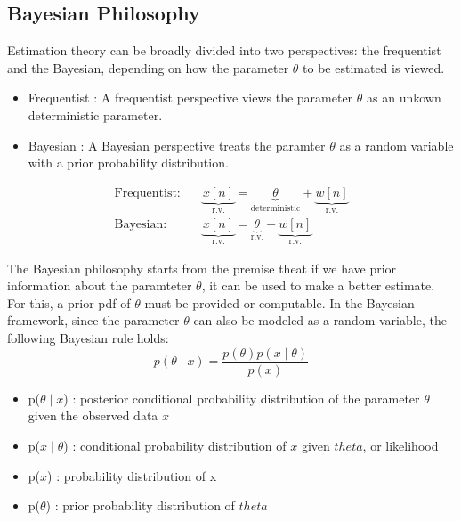 \documentclass[12pt,a4paper]{article}
\begin{document}
\subsection{Bayesian Philosophy}

Estimation theory can be broadly divided into two perspectives: the frequentist and the Bayesian, depending
on how the parameter \(\theta\) to be estimated is viewed.

\begin{itemize}
    \item Frequentist : A frequentist perspective views the parameter \(\theta\) as an unkown deterministic parameter.
    \item Bayesian : A Bayesian perspective treats the paramter \(\theta\) as a random variable with a prior probability distribution.
\end{itemize}

\begin{equation}
    \begin{aligned}
        \text{Frequentist:} \quad & \underbrace{x[n]}_{\text{r.v.}} = \underbrace{\theta}_{\text{deterministic}} + \underbrace{w[n]}_{\text{r.v.}} \\
        \text{Bayesian:} \quad    & \underbrace{x[n]}_{\text{r.v.}} = \underbrace{\theta}_{\text{r.v.}} + \underbrace{w[n]}_{\text{r.v.}}
    \end{aligned}
\end{equation}

The Bayesian philosophy starts from the premise theat if we have prior information about the
paramteter \(\theta\), it can be used to make a better estimate. For this, a prior pdf of \(\theta\) must be provided
or computable.
In the Bayesian framework, since the parameter \(\theta\) can also be modeled as a random variable,
the following Bayesian rule holds:
\begin{equation}
    p(\theta \mid x) = \frac{p(\theta)p(x \mid \theta)}{p(x)}
\end{equation}
\begin{itemize}
    \item  p(\(\theta\mid x\)) : posterior conditional probability distribution of the parameter \(\theta\) given the observed data \(x\)
    \item p(\(x\mid \theta\)) : conditional probability distribution of \(x\) given \(theta\), or likelihood
    \item p(\(x\)) : probability distribution of x
    \item p(\(\theta\)) : prior probability distribution of \(theta\)
\end{itemize}
\end{document}
